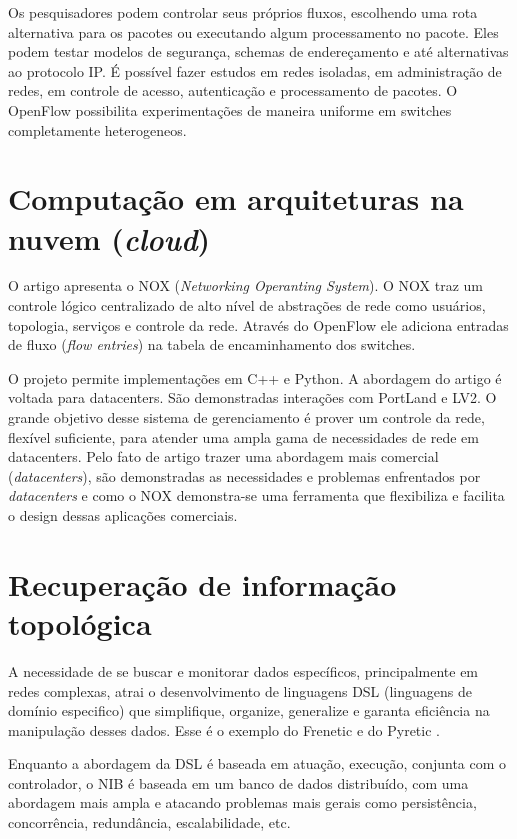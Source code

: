 Os pesquisadores podem controlar seus próprios fluxos, escolhendo uma rota
alternativa para os pacotes ou executando algum processamento no pacote. 
Eles podem testar modelos de segurança, schemas de endereçamento e até 
alternativas ao protocolo IP. 
É possível fazer estudos em redes isoladas, em administração de redes, 
em controle de acesso, autenticação e processamento de pacotes.
O OpenFlow possibilita experimentações de maneira uniforme em switches 
completamente heterogeneos. 

\section{Computação em arquiteturas na nuvem (\emph{cloud})}

O artigo \citep{arsalan2009applying} apresenta o NOX 
(\emph{Networking Operanting System}). 
O NOX traz um controle lógico centralizado de alto nível de abstrações de 
rede como usuários, topologia, serviços e controle da rede. 
Através do OpenFlow ele adiciona entradas de fluxo (\emph{flow entries}) na 
tabela de encaminhamento dos switches. 

O projeto permite implementações em C++ e Python. 
A abordagem do artigo é voltada para datacenters. 
São demonstradas interações com PortLand e LV2. 
O grande objetivo desse sistema de gerenciamento é prover um controle da rede,
flexível suficiente, para atender uma ampla gama de necessidades de rede em 
datacenters. 
Pelo fato de artigo trazer uma abordagem mais comercial (\emph{datacenters}), 
são demonstradas as necessidades e problemas enfrentados por 
\emph{datacenters} e como o NOX demonstra-se uma ferramenta que flexibiliza 
e facilita o design dessas aplicações comerciais.

\section{Recuperação de informação topológica}

A necessidade de se buscar e monitorar dados 
específicos, principalmente em redes complexas, atrai o desenvolvimento
de linguagens DSL (linguagens de domínio especifico) que simplifique, 
organize, generalize e garanta eficiência na manipulação desses dados.
Esse é o exemplo do Frenetic \citep{foster2011frenetic} 
e do Pyretic \citep{monsanto2013composing}.

Enquanto a abordagem da DSL é baseada em atuação, execução,
conjunta com o controlador,
o NIB é baseada em um banco de dados distribuído,
com uma abordagem mais ampla e atacando problemas mais gerais
como persistência, concorrência, redundância, escalabilidade, etc.

